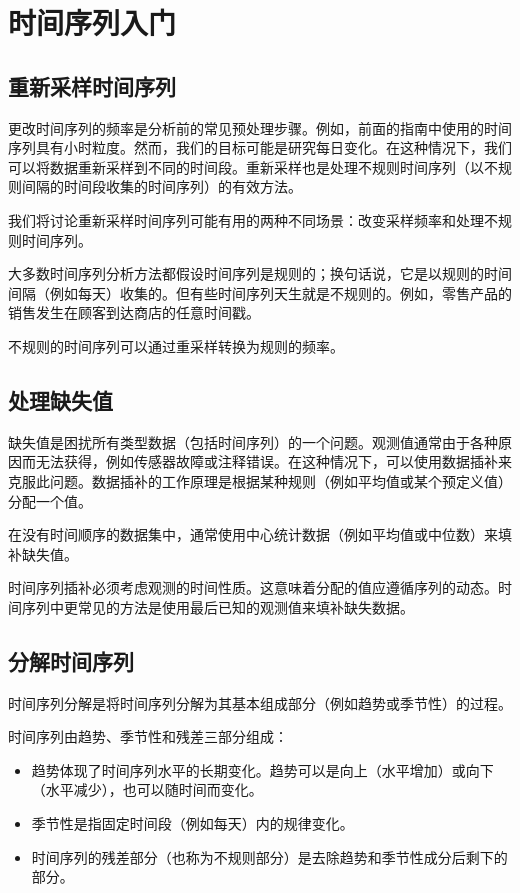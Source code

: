 \chapter{时间序列入门}
\section{重新采样时间序列}
更改时间序列的频率是分析前的常见预处理步骤。例如，前面的指南中使用的时间序列具有小时粒度。然而，我们的目标可能是研究每日变化。在这种情况下，我们可以将数据重新采样到不同的时间段。重新采样也是处理不规则时间序列（以不规则间隔的时间段收集的时间序列）的有效方法。

我们将讨论重新采样时间序列可能有用的两种不同场景：改变采样频率和处理不规则时间序列。

大多数时间序列分析方法都假设时间序列是规则的；换句话说，它是以规则的时间间隔（例如每天）收集的。但有些时间序列天生就是不规则的。例如，零售产品的销售发生在顾客到达商店的任意时间戳。

不规则的时间序列可以通过重采样转换为规则的频率。
\section{处理缺失值}
缺失值是困扰所有类型数据（包括时间序列）的一个问题。观测值通常由于各种原因而无法获得，例如传感器故障或注释错误。在这种情况下，可以使用数据插补来克服此问题。数据插补的工作原理是根据某种规则（例如平均值或某个预定义值）分配一个值。

在没有时间顺序的数据集中，通常使用中心统计数据（例如平均值或中位数）来填补缺失值。

时间序列插补必须考虑观测的时间性质。这意味着分配的值应遵循序列的动态。时间序列中更常见的方法是使用最后已知的观测值来填补缺失数据。
\section{分解时间序列}
时间序列分解是将时间序列分解为其基本组成部分（例如趋势或季节性）的过程。

时间序列由趋势、季节性和残差三部分组成：
\begin{itemize}
    \item 趋势体现了时间序列水平的长期变化。趋势可以是向上（水平增加）或向下（水平减少），也可以随时间而变化。
    \item 季节性是指固定时间段（例如每天）内的规律变化。
    \item 时间序列的残差部分（也称为不规则部分）是去除趋势和季节性成分后剩下的部分。
\end{itemize}

